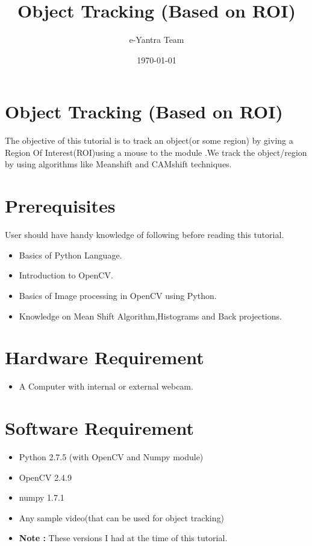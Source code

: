 \documentclass[11pt,a4paper]{article}
\title{Object Tracking (Based on ROI)}
\author{e-Yantra Team}
\date{\today}
\begin{document}
	\maketitle
	\newpage
	\tableofcontents
	\newpage
	\section{Object Tracking (Based on ROI)}
	The objective of this tutorial is to track an object(or some region) by giving a Region Of Interest(ROI)using a mouse to the module .We track the object/region by using algorithms like Meanshift and CAMshift techniques.
	\section{Prerequisites}
	User should have handy knowledge of following before reading this tutorial.
	\begin{itemize}
		\item Basics of Python Language.
		\item Introduction to OpenCV.
		\item Basics of Image processing in OpenCV using Python.
		\item Knowledge on Mean Shift Algorithm,Histograms and Back projections.
	\end{itemize}
	\section{Hardware Requirement}
	\begin{itemize}
		\item A Computer with internal or external webcam.
	\end{itemize}
	\section{Software Requirement}
	\begin{itemize}
		\item Python 2.7.5 (with OpenCV and Numpy module)
		\item OpenCV 2.4.9 
		\item numpy 1.7.1
		\item Any sample video(that can be used for object tracking)
		\item \textbf{Note :} These versions I had at the time of this tutorial.
	\end{itemize}
\end{document}
